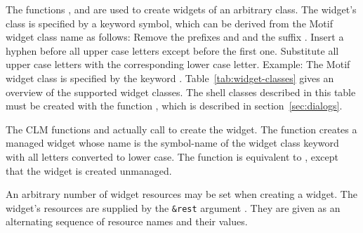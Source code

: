 The functions ,  and
 are used to create widgets of an arbitrary class. 
The widget's class is specified by a keyword symbol, which can be derived from
the Motif widget class name as follows: Remove the prefixes  and
 and the suffix .  Insert a hyphen before all upper
case letters except before the first one.  Substitute all upper case letters
with the corresponding lower case letter.  Example: The Motif widget class
 is specified by the keyword .
Table~\ref{tab:widget-classes} gives an overview of the supported widget
classes. The shell classes described in this table must be created with the
function , which is described in 
section~\ref{sec:dialogs}.

The CLM functions  and 
actually call  to create the widget.  The function
 creates a managed widget whose name is the symbol-name
of the widget class keyword with all letters converted to lower case.  The
function  is equivalent to ,
except that the widget is created unmanaged. 

An arbitrary number of widget resources may be set when creating a widget. The
widget's resources are supplied by the \verb+&rest+ argument .
They are given as an alternating sequence of resource names and their values.

